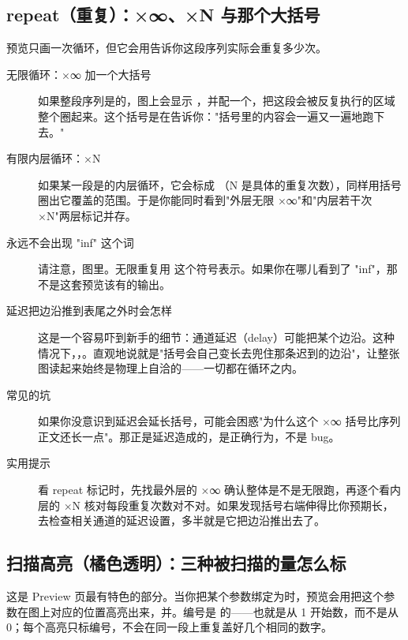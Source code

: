 \documentclass[11pt,oneside,openany]{book}
\begin{document}
\subsection{repeat（重复）：×∞、×N 与那个大括号}

预览只画一次循环，但它会用告诉你这段序列实际会重复多少次。

\begin{description}
\item[无限循环：×∞ 加一个大括号] 如果整段序列是的，图上会显示 ，并配一个，把这段会被反复执行的区域整个圈起来。这个括号是在告诉你："括号里的内容会一遍又一遍地跑下去。"
\item[有限内层循环：×N] 如果某一段是的内层循环，它会标成 （N 是具体的重复次数），同样用括号圈出它覆盖的范围。于是你能同时看到"外层无限 ×∞"和"内层若干次 ×N"两层标记并存。
\item[永远不会出现 "inf" 这个词] 请注意，图里。无限重复用  这个符号表示。如果你在哪儿看到了 "inf"，那不是这套预览该有的输出。
\item[延迟把边沿推到表尾之外时会怎样] 这是一个容易吓到新手的细节：通道延迟（delay）可能把某个边沿。这种情况下，，。直观地说就是"括号会自己变长去兜住那条迟到的边沿"，让整张图读起来始终是物理上自洽的——一切都在循环之内。
\item[常见的坑] 如果你没意识到延迟会延长括号，可能会困惑"为什么这个 ×∞ 括号比序列正文还长一点"。那正是延迟造成的，是正确行为，不是 bug。
\item[实用提示] 看 repeat 标记时，先找最外层的 ×∞ 确认整体是不是无限跑，再逐个看内层的 ×N 核对每段重复次数对不对。如果发现括号右端伸得比你预期长，去检查相关通道的延迟设置，多半就是它把边沿推出去了。
\end{description}

\subsection{扫描高亮（橘色透明）：三种被扫描的量怎么标}

这是 Preview 页最有特色的部分。当你把某个参数绑定为时，预览会用把这个参数在图上对应的位置高亮出来，并。编号是 的——也就是从 1 开始数，而不是从 0；每个高亮只标编号，不会在同一段上重复盖好几个相同的数字。
\end{document}
